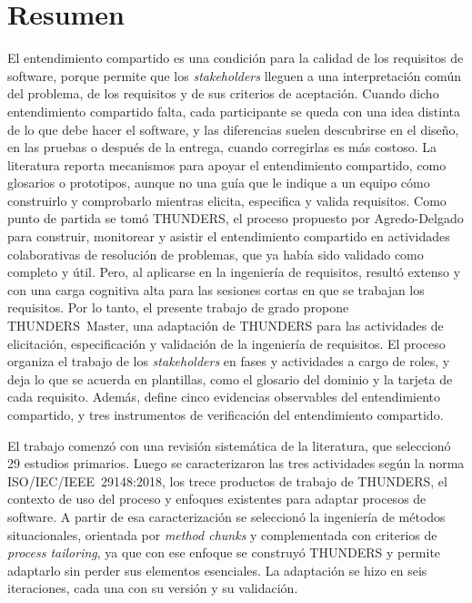 \documentclass[12pt,letterpaper,oneside]{report}
\begin{document}
\chapter*{Resumen}
\thispagestyle{plain}

El entendimiento compartido es una condición para la calidad de los requisitos
de software, porque permite que los \textit{stakeholders} lleguen a una
interpretación común del problema, de los requisitos y de sus criterios de
aceptación. Cuando dicho entendimiento compartido falta, cada participante se
queda con una idea distinta de lo que debe hacer el software, y las diferencias
suelen descubrirse en el diseño, en las pruebas o después de la entrega, cuando
corregirlas es más costoso. La literatura reporta mecanismos para apoyar el
entendimiento compartido, como glosarios o prototipos, aunque no una guía que le
indique a un equipo cómo construirlo y comprobarlo mientras elicita, especifica
y valida requisitos. Como punto de partida se tomó THUNDERS, el proceso
propuesto por Agredo-Delgado para construir, monitorear y asistir el
entendimiento compartido en actividades colaborativas de resolución de problemas, que ya había sido
validado como completo y útil. Pero, al aplicarse en la ingeniería de
requisitos, resultó extenso y con una carga cognitiva alta para las sesiones
cortas en que se trabajan los requisitos. Por lo tanto, el presente trabajo de
grado propone THUNDERS~Master, una adaptación de THUNDERS para las actividades
de elicitación, especificación y validación de la ingeniería de requisitos. El
proceso organiza el trabajo de los \textit{stakeholders} en fases y actividades
a cargo de roles, y deja lo que se acuerda en plantillas, como el glosario del
dominio y la tarjeta de cada requisito. Además, define cinco evidencias
observables del entendimiento compartido, y tres instrumentos de verificación
del entendimiento compartido.

El trabajo comenzó con una revisión sistemática de la literatura, que seleccionó
29 estudios primarios. Luego se caracterizaron las tres actividades según la
norma ISO/IEC/IEEE~29148:2018, los trece productos de trabajo de THUNDERS, el
contexto de uso del proceso y enfoques existentes para adaptar procesos de
software. A partir de esa caracterización se seleccionó la ingeniería de métodos
situacionales, orientada por \textit{method chunks} y complementada con criterios
de \textit{process tailoring}, ya que con ese enfoque se construyó THUNDERS y
permite adaptarlo sin perder sus elementos esenciales. La adaptación se hizo en
seis iteraciones, cada una con su versión y su validación.
\end{document}
